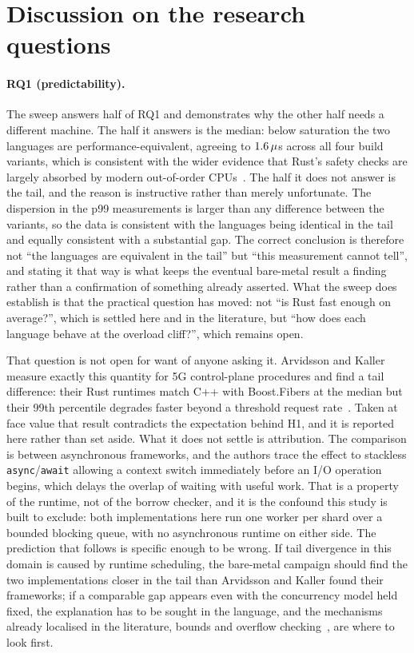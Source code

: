 \documentclass[english,twoside,openright,a4paper,censored,csm,software-track-2020]{HYthesisML}
\begin{document}
\section{Discussion on the research questions}
\paragraph{RQ1 (predictability).} The sweep answers half of RQ1 and demonstrates why the other
half needs a different machine. The half it answers is the median: below saturation the two
languages are performance-equivalent, agreeing to $1.6\,\mu$s across all four build
variants, which is consistent with the wider evidence that Rust's safety checks are largely
absorbed by modern out-of-order CPUs~\cite{emmerich2019drivers,balasubramanian2017rust}. The
half it does not answer is the tail, and the reason is instructive rather than merely
unfortunate. The dispersion in the p99 measurements is larger than any difference between the
variants, so the data is consistent with the languages being identical in the tail and equally
consistent with a substantial gap. The correct conclusion is therefore not ``the languages are
equivalent in the tail'' but ``this measurement cannot tell'', and stating it that way is what
keeps the eventual bare-metal result a finding rather than a confirmation of something already
asserted. What the sweep does establish is that the practical question has moved: not ``is Rust
fast enough on average?'', which is settled here and in the literature, but ``how does each
language behave at the overload cliff?'', which remains open.

That question is not open for want of anyone asking it. Arvidsson and Kaller measure exactly
this quantity for 5G control-plane procedures and find a tail difference: their Rust runtimes
match C++ with Boost.Fibers at the median but their 99th percentile degrades faster beyond a
threshold request rate~\cite{arvidsson2025async}. Taken at face value that result contradicts
the expectation behind H1, and it is reported here rather than set aside. What it does not
settle is attribution. The comparison is between asynchronous frameworks, and the authors trace
the effect to stackless \texttt{async}/\texttt{await} allowing a context switch immediately
before an I/O operation begins, which delays the overlap of waiting with useful work. That is a
property of the runtime, not of the borrow checker, and it is the confound this study is built
to exclude: both implementations here run one worker per shard over a bounded blocking queue,
with no asynchronous runtime on either side. The prediction that follows is specific enough to
be wrong. If tail divergence in this domain is caused by runtime scheduling, the bare-metal
campaign should find the two implementations closer in the tail than Arvidsson and Kaller found
their frameworks; if a comparable gap appears even with the concurrency model held fixed, the
explanation has to be sought in the language, and the mechanisms already localised in the
literature, bounds and overflow checking~\cite{zhang2022runtime,harris2023morello}, are where
to look first.
\end{document}
